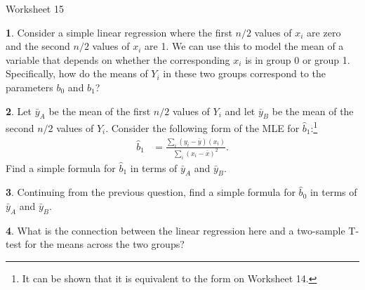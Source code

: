 \documentclass{tufte-handout}
\begin{document}
\justify

{\LARGE Worksheet 15}

\vspace*{18pt}


\textbf{1}. Consider a simple linear regression where the first $n/2$ values of $x_i$ are 
zero and the second $n/2$ values of $x_i$ are 1. We can use this to model the
mean of a variable that depends on whether the corresponding $x_i$ is in group
0 or group 1. Specifically, how do the means of $Y_i$ in these two groups
correspond to the parameters $b_0$ and $b_1$?

\textbf{2}. Let $\bar{y}_A$ be the mean of the first $n/2$ values of $Y_i$ and let $\bar{y}_B$
be the mean of the second $n/2$ values of $Y_i$. Consider the following form of the
MLE for $\widehat{b}_1$:\footnote{
  It can be shown that it is equivalent to the form on Worksheet 14.
}
\begin{align*}
\widehat{b}_1 &= \frac{\sum_i (y_i - \bar{y}) (x_i)}{\sum_i (x_i - \bar{x})^2}.
\end{align*}
Find a simple formula for $\widehat{b}_1$ in terms of $\bar{y}_A$ and $\bar{y}_B$.

\textbf{3}. Continuing from the previous question, find a simple formula for $\widehat{b}_0$
in terms of $\bar{y}_A$ and $\bar{y}_B$.

\textbf{4}. What is the connection between the linear regression here and a two-sample T-test
for the means across the two groups?
\end{document}
